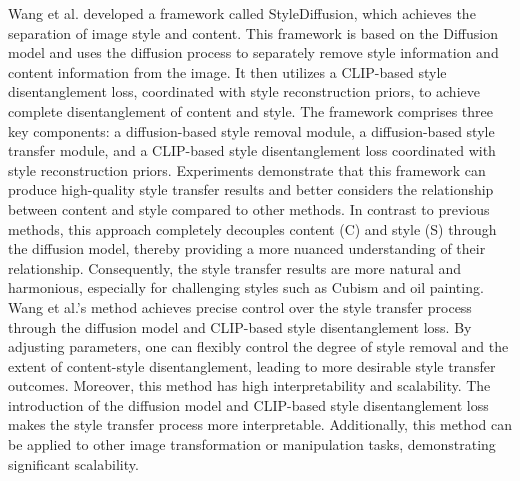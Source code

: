 \documentclass[preprint,12pt]{elsarticle}
\begin{document}
Wang et al.\citep{64wang2023stylediffusion} developed a framework called StyleDiffusion, which achieves the separation of image style and content. This framework is based on the Diffusion model and uses the diffusion process to separately remove style information and content information from the image. It then utilizes a CLIP-based style disentanglement loss, coordinated with style reconstruction priors, to achieve complete disentanglement of content and style. The framework comprises three key components: a diffusion-based style removal module, a diffusion-based style transfer module, and a CLIP-based style disentanglement loss coordinated with style reconstruction priors. Experiments demonstrate that this framework can produce high-quality style transfer results and better considers the relationship between content and style compared to other methods. In contrast to previous methods, this approach completely decouples content (C) and style (S) through the diffusion model, thereby providing a more nuanced understanding of their relationship. Consequently, the style transfer results are more natural and harmonious, especially for challenging styles such as Cubism and oil painting. Wang et al.’s method achieves precise control over the style transfer process through the diffusion model and CLIP-based style disentanglement loss. By adjusting parameters, one can flexibly control the degree of style removal and the extent of content-style disentanglement, leading to more desirable style transfer outcomes. Moreover, this method has high interpretability and scalability. The introduction of the diffusion model and CLIP-based style disentanglement loss makes the style transfer process more interpretable. Additionally, this method can be applied to other image transformation or manipulation tasks, demonstrating significant scalability.
\end{document}
